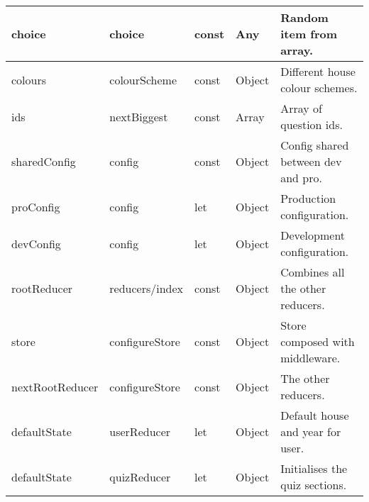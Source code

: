 \begin{longtable}{|l|l|l|l|l|}
choice                              & choice                               & const                              & Any                                  & Random item from array.               \\ \hline
colours                             & colourScheme                         & const                              & Object                               & Different house colour schemes.       \\ \hline
ids                                 & nextBiggest                          & const                              & Array                                & Array of question ids.                \\ \hline
sharedConfig                        & config                               & const                              & Object                               & Config shared between dev and pro.    \\ \hline
proConfig                           & config                               & let                                & Object                               & Production configuration.             \\ \hline
devConfig                           & config                               & let                                & Object                               & Development configuration.            \\ \hline
rootReducer                         & reducers/index                       & const                              & Object                               & Combines all the other reducers.      \\ \hline
store                               & configureStore                       & const                              & Object                               & Store composed with middleware.       \\ \hline
nextRootReducer                     & configureStore                       & const                              & Object                               & The other reducers.                   \\ \hline
defaultState                        & userReducer                          & let                                & Object                               & Default house and year for user.      \\ \hline
defaultState                        & quizReducer                          & let                                & Object                               & Initialises the quiz sections.        \\ \hline

\end{longtable}
